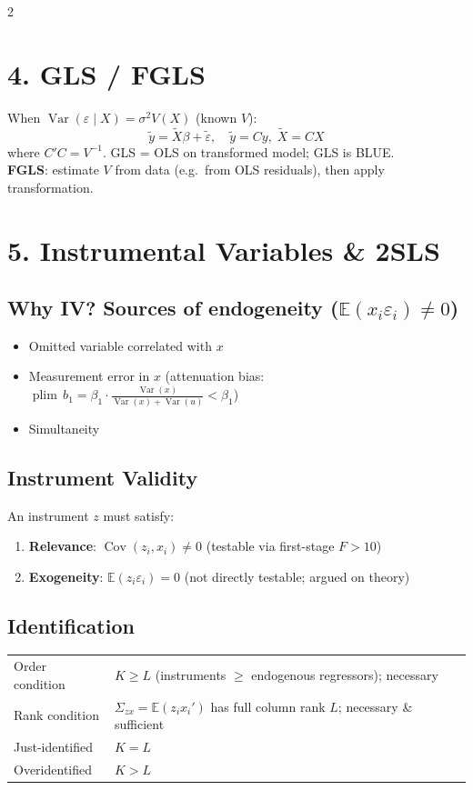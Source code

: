 \documentclass[9pt,a4paper]{article}
\newcommand{\plim}{\operatorname{plim}}
\newcommand{\Var}{\operatorname{Var}}
\newcommand{\Cov}{\operatorname{Cov}}
\newcommand{\E}{\mathbb{E}}
\begin{document}
\begin{multicols}{2}
\section{4.\; GLS / FGLS}

When $\Var(\varepsilon \mid X) = \sigma^2 V(X)$ (known $V$):
\[
  \tilde{y} = \tilde{X}\beta + \tilde{\varepsilon}, \quad \tilde{y}=Cy,\;\tilde{X}=CX
\]
where $C'C = V^{-1}$. GLS = OLS on transformed model; GLS is BLUE.\\
\textbf{FGLS}: estimate $V$ from data (e.g.\ from OLS residuals), then apply transformation.

\section{5.\; Instrumental Variables \& 2SLS}

\subsection*{Why IV? Sources of endogeneity ($\E(x_i\varepsilon_i)\neq 0$)}
\begin{itemize}[noitemsep,topsep=0pt,leftmargin=*]
  \item Omitted variable correlated with $x$
  \item Measurement error in $x$ (attenuation bias: $\plim\,b_1 = \beta_1\cdot\tfrac{\Var(x)}{\Var(x)+\Var(u)} < \beta_1$)
  \item Simultaneity
\end{itemize}

\subsection*{Instrument Validity}
An instrument $z$ must satisfy:
\begin{enumerate}[noitemsep,topsep=0pt,leftmargin=*]
  \item \textbf{Relevance}: $\Cov(z_i,x_i)\neq 0$ (testable via first-stage $F>10$)
  \item \textbf{Exogeneity}: $\E(z_i\varepsilon_i)=0$ (not directly testable; argued on theory)
\end{enumerate}

\subsection*{Identification}
\begin{tabular}{@{}lp{5.5cm}@{}}
  Order condition & $K \geq L$ \;(instruments $\geq$ endogenous regressors); necessary \\
  Rank condition & $\Sigma_{zx}=\E(z_ix_i')$ has full column rank $L$; necessary \& sufficient \\
  Just-identified & $K=L$ \\
  Overidentified & $K>L$ \\
\end{tabular}


\end{multicols}
\end{document}
